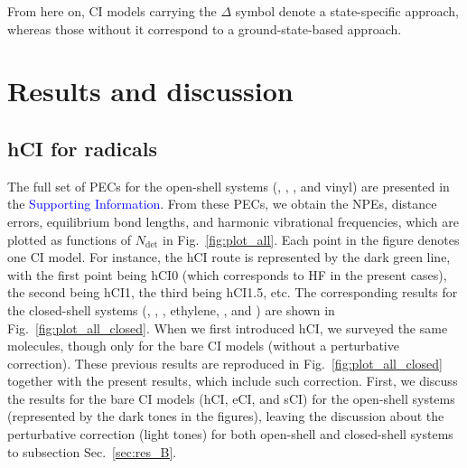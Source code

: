 \documentclass[aip,jcp,reprint,noshowkeys,superscriptaddress]{revtex4-1}
\newcommand{\SupInf}{\textcolor{blue}{Supporting Information}}
\newcommand{\Ndet}{N_\text{det}}
\begin{document}
From here on, CI models carrying the $\Delta$ symbol denote a state-specific approach, whereas those without it correspond to a ground-state-based approach.

\section{Results and discussion}
\label{sec:res}

\subsection{hCI for radicals}
\label{sec:res_A}

The full set of PECs for the open-shell systems (, , , and vinyl) are presented in the {\SupInf}.
From these PECs, we obtain the NPEs, distance errors, equilibrium bond lengths, and harmonic vibrational frequencies, which are plotted as functions of $\Ndet$ in Fig.~\ref{fig:plot_all}.
Each point in the figure denotes one CI model.
For instance, the hCI route is represented by the dark green line, with the first point being hCI0 (which corresponds to HF in the present cases), the second being hCI1, the third being hCI1.5, etc.
The corresponding results for the closed-shell systems (, , , ethylene, , and ) are shown in Fig.~\ref{fig:plot_all_closed}.
When we first introduced hCI, \cite{Kossoski_2022} we surveyed the same molecules, though only for the bare CI models (without a perturbative correction).
These previous results are reproduced in Fig.~\ref{fig:plot_all_closed} together with the present results, which include such correction.
First, we discuss the results for the bare CI models (hCI, eCI, and sCI) for the open-shell systems (represented by the dark tones in the figures),
leaving the discussion about the perturbative correction (light tones) for both open-shell and closed-shell systems to subsection Sec.~\ref{sec:res_B}.
\end{document}
